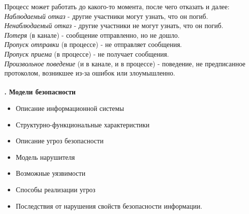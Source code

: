 Процесс может работать до какого-то момента, после чего отказать и далее:\\
 \textit{Наблюдаемый отказ}  -  другие участники могут узнать, что он погиб.\\
 \textit{Ненаблюдаемый отказ}  - другие участники не могут узнать, что он погиб.\\
\textit{Потеря} (в канале) - сообщение отправленно, но не дошло. \\
\textit{Пропуск отправки} (в процессе) - не отправляет сообщения.\\
\textit{Пропуск приема} (в процессе) - не получает сообщения.\\
\textit{Произвольное поведение} (и в канале, и в процессе) - поведение, не предписанное протоколом, возникшее из-за ошибок или злоумышленно.\\
\\
\textbf{. Модели безопасности}
\begin{itemize}
\setlength\itemsep{0.0001em}
\item Описание информационной системы
\item Структурно-функциональные характеристики
\item Описание угроз безопасности
\item Модель нарушителя
\item Возможные уязвимости
\item Способы реализации угроз
\item Последствия от нарушения свойств безопасности информации.
\end{itemize}




